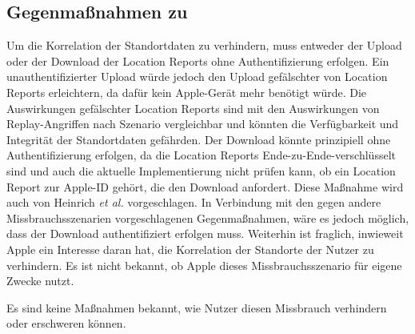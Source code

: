 \subsection{Gegenmaßnahmen zu }
Um die Korrelation der Standortdaten zu verhindern, muss entweder der Upload oder der Download der Location Reports ohne Authentifizierung erfolgen.
Ein unauthentifizierter Upload würde jedoch den Upload gefälschter von Location Reports erleichtern, da dafür kein Apple-Gerät mehr benötigt würde.
Die Auswirkungen gefälschter Location Reports sind mit den Auswirkungen von Replay-Angriffen nach Szenario  vergleichbar und könnten die Verfügbarkeit und Integrität der Standortdaten gefährden.
Der Download könnte prinzipiell ohne Authentifizierung erfolgen, da die Location Reports Ende-zu-Ende-verschlüsselt sind und auch die aktuelle Implementierung nicht prüfen kann, ob ein Location Report zur Apple-ID gehört, die den Download anfordert.
Diese Maßnahme wird auch von Heinrich \textit{et al.} \cite{Heinrich_FindMy} vorgeschlagen.
In Verbindung mit den gegen andere Missbrauchsszenarien vorgeschlagenen Gegenmaßnahmen, wäre es jedoch möglich, dass der Download authentifiziert erfolgen muss.
Weiterhin ist fraglich, inwieweit Apple ein Interesse daran hat, die Korrelation der Standorte der Nutzer zu verhindern.
Es ist nicht bekannt, ob Apple dieses Missbrauchsszenario für eigene Zwecke nutzt.

Es sind keine Maßnahmen bekannt, wie Nutzer diesen Missbrauch verhindern oder erschweren können.
